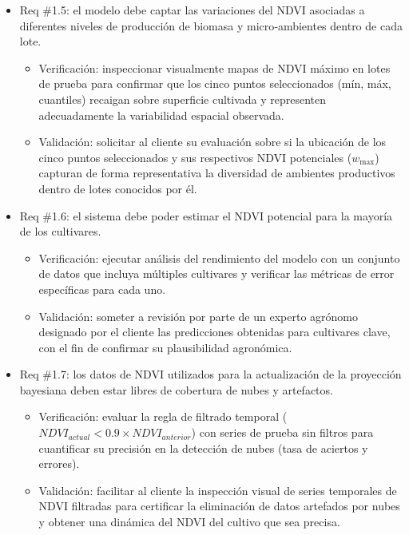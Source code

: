\documentclass[
11pt, %
]{charter}
\begin{document}
\begin{itemize}
    \item Req \#1.5: el modelo debe captar las variaciones del NDVI asociadas a diferentes niveles de producción de biomasa y micro‑ambientes dentro de cada lote.
    \begin{itemize}
        \item Verificación: inspeccionar visualmente mapas de NDVI máximo en lotes de prueba para confirmar que los cinco puntos seleccionados (mín, máx, cuantiles) recaigan sobre superficie cultivada y representen adecuadamente la variabilidad espacial observada.
        \item Validación: solicitar al cliente su evaluación sobre si la ubicación de los cinco puntos seleccionados y sus respectivos NDVI potenciales ($w_{\text{max}}$) capturan de forma representativa la diversidad de ambientes productivos dentro de lotes conocidos por él.
    \end{itemize}

    \item Req \#1.6: el sistema debe poder estimar el NDVI potencial para la mayoría de los cultivares.
    \begin{itemize}
        \item Verificación: ejecutar análisis del rendimiento del modelo con un conjunto de datos que incluya múltiples cultivares y verificar las métricas de error específicas para cada uno.
        \item Validación: someter a revisión por parte de un experto agrónomo designado por el cliente las predicciones obtenidas para cultivares clave, con el fin de confirmar su plausibilidad agronómica.
    \end{itemize}

    \item Req \#1.7: los datos de NDVI utilizados para la actualización de la proyección bayesiana deben estar libres de cobertura de nubes y artefactos.
    \begin{itemize}
        \item Verificación: evaluar la regla de filtrado temporal ($NDVI_{actual} < 0.9 \times NDVI_{anterior}$) con series de prueba sin filtros para cuantificar su precisión en la detección de nubes (tasa de aciertos y errores).
        \item Validación: facilitar al cliente la inspección visual de series temporales de NDVI filtradas para certificar la eliminación de datos artefados por nubes y obtener una dinámica del NDVI del cultivo que sea precisa.
    \end{itemize}


\end{itemize}
\end{document}
